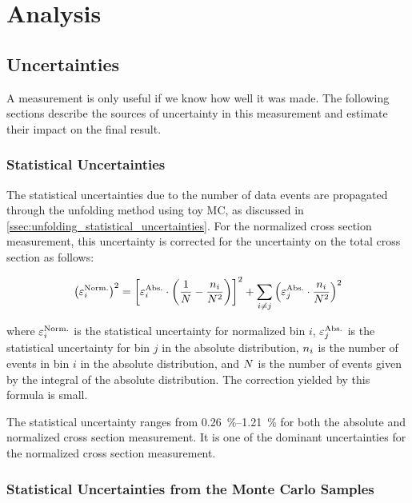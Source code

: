 \chapter{Analysis}
\label{chapter:analysis}

\section{Uncertainties}
\label{sec:uncertainties}

A measurement is only useful if we know how well it was made. The following
sections describe the sources of uncertainty in this measurement and estimate
their impact on the final result.

\subsection{Statistical Uncertainties}
\label{ssec:stat_uncertainty}

The statistical uncertainties due to the number of data events are propagated
through the unfolding method using toy MC, as discussed in
\cref{ssec:unfolding_statistical_uncertainties}. For the normalized cross
section measurement, this uncertainty is corrected for the uncertainty on the
total cross section as follows:

\begin{equation} \label{eq:stat}
    \left( \varepsilon^{\text{Norm.}}_{i} \right)^{2}
    =
    \left[
    \varepsilon^{\text{Abs.}}_{i} \cdot
        \left(
            \frac{1}{N} - \frac{n_{i}}{N^{2}}
        \right)
    \right]^{2}
    +
    \sum_{i \ne j}
    \left(
        \varepsilon^{\text{Abs.}}_{j} \cdot \frac{n_{i}}{N^{2}}
    \right)^{2}
\end{equation}

where $\varepsilon^{\text{Norm.}}_{i}$ is the statistical uncertainty for normalized bin $i$,
$\varepsilon^{\text{Abs.}}_{j}$ is the statistical uncertainty for bin $j$ in the absolute
distribution, $n_{i}$ is the number of events in bin $i$ in the absolute
distribution, and $N$ is the number of events given by the integral of
the absolute distribution. The correction yielded by this formula is small.

The statistical uncertainty ranges from \SIrange{0.26}{1.21}{\percent} for both
the absolute and normalized cross section measurement. It is one of the
dominant uncertainties for the normalized cross section measurement.

\subsection{Statistical Uncertainties from the Monte Carlo Samples}
\label{ssec:mc_stat_uncertainty}


